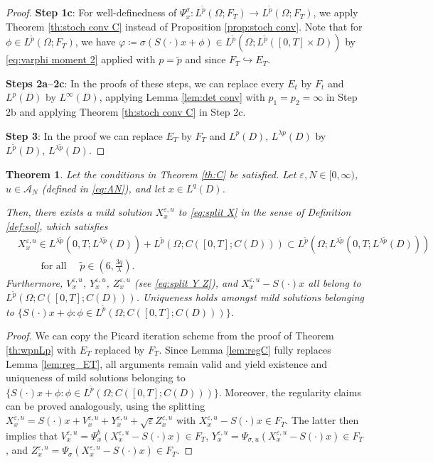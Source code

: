 \documentclass{amsart}
\theoremstyle{plain}
\newtheorem{theorem}{Theorem}[section]
\theoremstyle{remark}
\theoremstyle{plain}
\numberwithin{equation}{section}
\newcommand{\ceqq}{\coloneqq}
\newcommand{\col}{\colon}
\newcommand{\eps}{\varepsilon}
\newcommand{\Om}{\Omega}
\newcommand{\A}{{\mathcal A}}
\newcommand{\into}{\hookrightarrow}
\begin{document}
\begin{proof}
\textbf{Step 1c}: 
For well-definedness of $\Psi_x^{\sigma}\col L^{\tilde p}(\Om;F_T)\to L^{\tilde p}(\Om;F_T)$, we apply Theorem \ref{th:stoch conv C} instead of Proposition \ref{prop:stoch conv}.  Note that for $\phi\in L^{\tilde p}(\Om;F_T)$, we have $\varphi\ceqq \sigma(S(\cdot)x+\phi)\in L^{\tilde p}(\Om;L^{\tilde p}([0,T]\times D))$ by \eqref{eq:varphi moment 2} applied with $p=\tilde p$ and since $F_T\into E_T$. 

\textbf{Steps 2a--2c}: In the proofs of these steps, we can replace every $E_t$ by $F_t$ and $L^p(D)$ by $L^\infty(D)$, applying Lemma \ref{lem:det conv}   with $p_1=p_2=\infty$ in Step 2b and applying  Theorem \ref{th:stoch conv C} in Step 2c. 
 
\textbf{Step 3}: In the proof we can replace $E_T$ by $F_T$ and $L^p(D)$, $L^{\lambda p}(D)$ by $L^{\tilde p}(D)$, $L^{\lambda\tilde p}(D)$.  
\end{proof}


\begin{theorem}\label{th:wpnC}
Let the conditions in Theorem \ref{th:C} be satisfied. Let $\eps,N\in[0,\infty)$, $u\in \A_N$ (defined in \eqref{eq:AN}), and let  $x\in L^q(D)$. 

Then, there exists a mild solution $X_x^{\eps,u}$ to \eqref{eq:split X} in the sense of Definition \ref{def:sol}, which  satisfies 
\begin{align*}
&X_x^{\eps,u}\in L^{\lambda \tilde p}(0,T;L^{\lambda \tilde p}(D))+ L^{\tilde{p}}(\Omega;C([0,T];C(D)))\subset L^{\tilde p}(\Om;L^{\lambda \tilde p}(0,T;L^{\lambda \tilde p}(D)))\\
&\qquad\text{ for all }\quad \tilde{p}\in (6,\frac{3q}{\lambda}). 
\end{align*}
 Furthermore, $V^{\eps,u}_x$, $Y^{\eps,u}_x$, $Z^{\eps,u}_x$ (see  \eqref{eq:split Y Z}), and $X^{\eps,u}_x -S(\cdot)x$   all belong to  $L^{\tilde{p}}(\Omega;C([0,T];C(D)))$.  
 Uniqueness holds amongst mild solutions belonging to $\{S(\cdot)x+\phi:\phi\in L^{\tilde p}(\Om;C([0,T];C(D)))\}$. 
\end{theorem} 
\begin{proof}
We can copy the Picard iteration scheme from the proof of Theorem \ref{th:wpnLp} with $E_T$ replaced by $F_T$. Since Lemma \ref{lem:regC} fully replaces Lemma  \ref{lem:reg_ET}, all arguments remain valid and yield existence and uniqueness of mild solutions belonging to $\{S(\cdot)x+\phi:\phi\in L^{\tilde p}(\Om;C([0,T];C(D)))\}$. Moreover, the regularity claims can be proved analogously, using the splitting    
$X_x^{\eps,u}=S(\cdot)x+V_x^{\eps,u}+Y_x^{\eps,u}+\sqrt{\eps}Z_x^{\eps,u}$ with $X_x^{\eps,u}-S(\cdot)x\in F_T$. The latter then implies that $V_x^{\eps,u}=\Psi_x^b(X_x^{\eps,u}-S(\cdot)x)\in F_T$, $Y_x^{\eps,u}=\Psi_{\sigma,u}(X_x^{\eps,u}-S(\cdot)x)\in F_T$, and $Z_x^{\eps,u}=\Psi_{\sigma}(X_x^{\eps,u}-S(\cdot)x)\in  F_T$. 
\end{proof}
\end{document}
